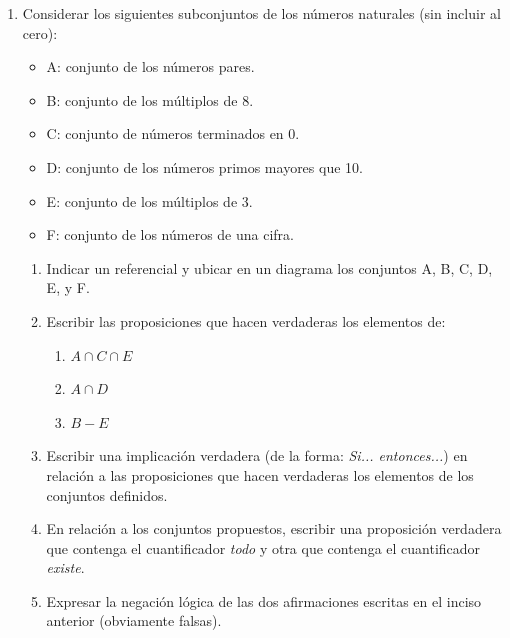 \documentclass[12pt]{article}
\theoremstyle{definition}
\theoremstyle{remark}
\begin{document}
\begin{enumerate} 
\item  Considerar los siguientes subconjuntos de los números naturales (sin incluir al cero):
\begin{itemize}
\setlength\itemsep{0em}
\item A: conjunto de los números pares.
\item B: conjunto de los múltiplos de 8.
\item C: conjunto de números terminados en 0.	
\item D: conjunto de los números primos mayores que 10.
\item E: conjunto de los múltiplos de 3. 
\item F: conjunto de los números de una cifra. 
\end{itemize}

\begin{enumerate}
\setlength\itemsep{0em}
\item Indicar un referencial y ubicar en un diagrama los conjuntos A, B, C, D, E, y F.
\item Escribir las proposiciones que hacen verdaderas los elementos de:\\
 \begin{enumerate}
     \item $A \cap C \cap E$
     \item $A\cap D$
     \item $B -  E$
\end{enumerate}
\item Escribir una implicación verdadera (de la forma: \textit{Si... entonces...}) en relación a las proposiciones que hacen verdaderas los elementos de los conjuntos definidos.
\item En relación a los conjuntos propuestos, escribir una proposición verdadera que contenga el cuantificador \textit{todo} y otra que contenga el cuantificador \textit{existe}.
\item Expresar la negación lógica de las dos afirmaciones escritas en el inciso anterior (obviamente falsas).
\end{enumerate}


\end{enumerate}
\end{document}
